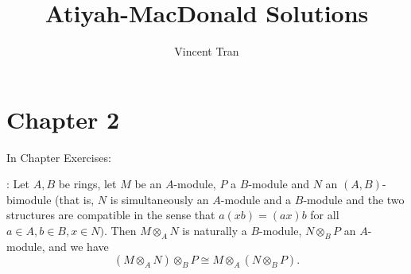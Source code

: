 \documentclass[a4paper]{exam}
\title{Atiyah-MacDonald Solutions}
\author{Vincent Tran}
\begin{document}
\maketitle

\section{Chapter 2}

In Chapter Exercises:

\begin{questions}

	: Let $A,B$ be rings, let $M$ be an $A$-module, $P$ a $B$-module and $N$ an $(A, B)$-bimodule (that is, $N$ is simultaneously an $A$-module and a $B$-module and the two structures are compatible in the sense that $a(xb) = (ax)b$ for all $a \in A, b\in B, x \in N)$. Then $M \otimes _A N$ is naturally a $B$-module, $N \otimes _B P$ an $A$-module, and we have
	\[
		(M \otimes _A N) \otimes _B P \cong M \otimes _A (N \otimes _B P)
	.\]
	\begin{solution}


\end{solution}
\end{questions}
\end{document}
